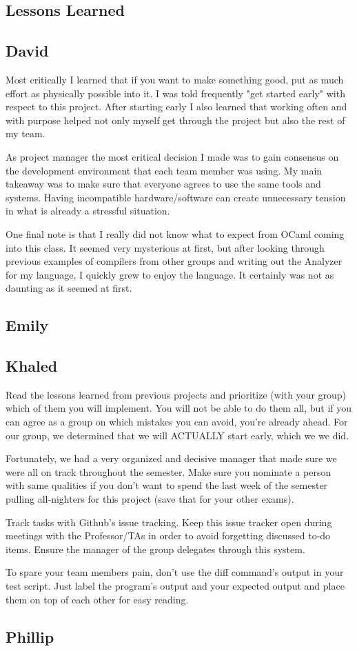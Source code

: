 \begin{homeworkProblem}
	\chapter{Lessons Learned}
	\section{David}
	Most critically I learned that if you want to make something good, put as much effort as physically possible into it. I was told frequently "get started early" with respect to this project. After starting early I also learned that working often and with purpose helped not only myself get through the project but also the rest of my team. 
	
	As project manager the most critical decision I made was to gain consensus on the development environment that each team member was using. My main takeaway was to make sure that everyone agrees to use the same tools and systems. Having incompatible hardware/software can create unnecessary tension in what is already a stressful situation. 
	
	One final note is that I really did not know what to expect from OCaml coming into this class. It seemed very mysterious at first, but after looking through previous examples of compilers from other groups and writing out the Analyzer for my language, I quickly grew to enjoy the language. It certainly was not as daunting as it seemed at first. 
	\section{Emily}
	\section{Khaled}
	Read the lessons learned from previous projects and prioritize (with your group) which of them you will implement. You will not be able to do them all, but if you can agree as a group on which mistakes you can avoid, you're already ahead. For our group, we determined that we will ACTUALLY start early, which we we did.
	
	Fortunately, we had a very organized and decisive manager that made sure we were all on track throughout the semester. Make sure you nominate a person with same qualities if you don't want to spend the last week of the semester pulling all-nighters for this project (save that for your other exams).
	
	Track tasks with Github's issue tracking. Keep this issue tracker open during meetings with the Professor/TAs in order to avoid forgetting discussed to-do items. Ensure the manager of the group delegates through this system.
	
	To spare your team members pain, don't use the diff command's output in your test script. Just label the program's output and your expected output and place them on top of each other for easy reading. 
	\section{Phillip}
\end{homeworkProblem}